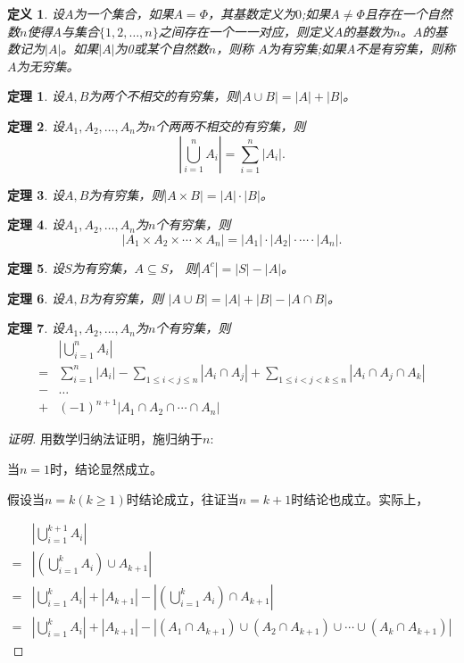 \documentclass{book}[oneside]
\newtheorem{Def}{定义}[chapter]
\newtheorem{Thm}{定理}[chapter]
\begin{document}
\begin{CJK*}{UTF8}{gbsn}
  \begin{Def}
设$A$为一个集合，如果$A=\Phi$，其基数定义为$0$;如果$A \neq \Phi$且存在一个自然数$n$使得$A$与集合$\{1,2,\ldots, n\}$之间存在一个一一对应，则定义$A$的基数为$n$。$A$的基数记为$|A|$。如果$|A|$为0或某个自然数$n$，则称
$A$为有穷集;如果A不是有穷集，则称$A$为无穷集。   
  \end{Def}
  \begin{Thm}
    设$A,B$为两个不相交的有穷集，则$|A \cup B| = |A| + |B|$。
  \end{Thm}
  \begin{Thm}
    设$A_1,A_2, \ldots, A_n$为$n$个两两不相交的有穷集，则\[|\bigcup_{i=1}^{n}A_i|=\sum_{i=1}^{n}|A_i|.\]
  \end{Thm}
  \begin{Thm}
    设$A,B$为有穷集，则$|A \times B| = |A| \cdot |B|$。
  \end{Thm}
  \begin{Thm}
    设$A_1,A_2, \ldots, A_n$为$n$个有穷集，则\[|A_1 \times A_2 \times \cdots \times A_n|=|A_1|\cdot |A_2| \cdot \cdots \cdot |A_n|.\]
  \end{Thm}
\begin{Thm}
  设$S$为有穷集，$A \subseteq S$， 则$|A^c| = |S| - |A|$。
\end{Thm}
\begin{Thm}
  设$A,B$为有穷集，则
$|A \cup B| = |A| + |B| - |A \cap B|$。
\end{Thm}

\begin{Thm}
  设$A_1, A_2, \ldots, A_n$为$n$个有穷集，则
  \begin{equation*}
\begin{split}
    &|\bigcup_{i=1}^nA_i|\\
=&\sum_{i=1}^n|A_i| - \sum_{1\leq i < j \leq n}|A_i \cap A_j| + \sum_{1 \leq  i < j < k \leq n}|A_i \cap A_j \cap A_k|\\
-&\ldots\\
+&(-1)^{n+1}|A_1 \cap A_2 \cap \cdots \cap A_n| 
  \end{split}
\end{equation*}
\end{Thm}
\begin{proof}[证明]
用数学归纳法证明，施归纳于$n$:

当$n=1$时，结论显然成立。

假设当$n=k(k \geq 1)$时结论成立，往证当$n=k+1$时结论也成立。实际上，

  \begin{equation}\label{eq1}
    \begin{split}
      &|\bigcup_{i=1}^{k+1}A_i|\\
      =&|(\bigcup_{i=1}^kA_i) \cup A_{k+1}|\\
      =&|\bigcup_{i=1}^kA_i| + |A_{k+1}| - |(\bigcup_{i=1}^kA_i) \cap A_{k+1}|\\
      =&|\bigcup_{i=1}^kA_i| + |A_{k+1}| - |(A_1 \cap A_{k+1}) \cup (A_2 \cap A_{k+1}) \cup \cdots \cup (A_k \cap A_{k+1})|
    \end{split}
  \end{equation}


\end{proof}
\end{CJK*}
\end{document}
